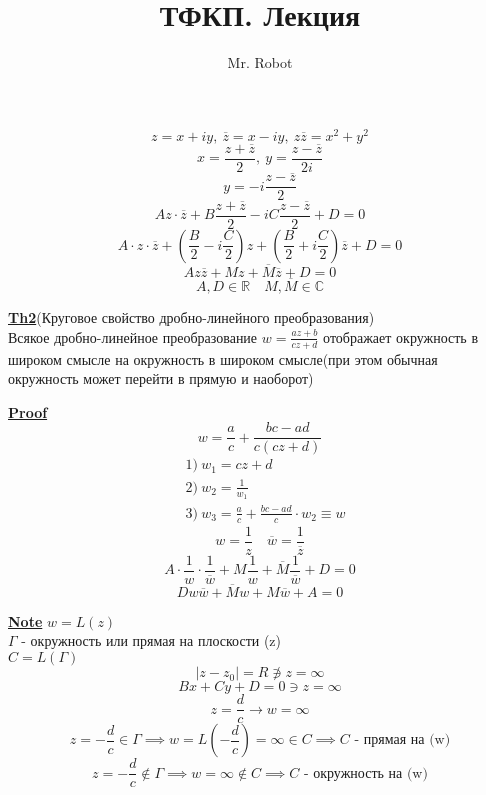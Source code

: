 \documentclass[a4paper]{article}
\begin{document}
\title{ТФКП. Лекция}
\author{Mr. Robot}
\maketitle

\[
    z = x +iy, \ \overline{z} = x - iy, \ z \overline{z} = x^2 + y^2
\]
\[
    x = \frac{z + \overline{z}}{2} , \ y = \frac{z - \overline{z}}{2i} 
\]
\[
    y = -i \frac{z - \overline{z}}{2} 
\]
\[
    A z \cdot \overline{z} + B \frac{z + \overline{z}}{2} -i C \frac{z - \overline{z}}{2} 
    + D = 0
\]
\[
    A \cdot z \cdot \overline{z} + \left(\frac{B}{2} -i \frac{C}{2}\right)z + 
    \left(\frac{B}{2} + i \frac{C}{2} \right) \overline{z} + D = 0
\]
\[
    A z \overline{z} + Mz + \overline{M} \overline{z} + D = 0
\]
\[
    A,D \in \mathbb{R} \quad M,\overline{M} \in \mathbb{C}
\]

\begin{tcolorbox}
\textbf{\underline{Th2}}(Круговое свойство дробно-линейного преобразования)\\
Всякое дробно-линейное преобразование $ w = \frac{az + b}{cz + d}  $ отображает
окружность в широком смысле на окружность в широком смысле(при этом обычная 
окружность может перейти в прямую и наоборот)

\textbf{\underline{Proof}} 
\[
    w = \frac{a}{c} + \frac{bc - ad}{c(cz+d)} 
\]
\[
\begin{aligned}
    &1) \  w_1 = cz + d\\
    &2) \  w_2 = \frac{1}{w_1} \\
    &3) \  w_3 = \frac{a}{c} + \frac{bc - ad}{c} \cdot w_2 \equiv w
\end{aligned}
\]
\[
    w = \frac{1}{z} \quad \overline{w} = \frac{1}{\overline{z}} 
\]
\[
    A \cdot \frac{1}{w} \cdot \frac{1}{\overline{w}} + M \frac{1}{w} + \overline{M}
    \frac{1}{\overline{w}} + D = 0
\]
\[
    D w \overline{w} + \overline{M} w + M \overline{w} + A = 0
\]
\end{tcolorbox}

\textbf{\underline{Note}} $ w = L(z) $ \\
$ \Gamma $ - окружность или прямая на плоскости (z)\\
$ C = L(\Gamma) $ 
\[
    |z - z_0| = R \not\ni z = \infty
\]
\[
    Bx + Cy + D = 0 \ni z = \infty
\]
\[
    z = \frac{d}{c} \rightarrow w = \infty
\]
\[
    z = -\frac{d}{c} \in \Gamma \implies w = L(-\frac{d}{c} ) = \infty \in C \implies
    C \text{ - прямая на (w)}
\]
\[
    z = - \frac{d}{c} \notin \Gamma \implies w = \infty \notin C \implies
    C \text{ - окружность на (w)}
\]
\end{document}
